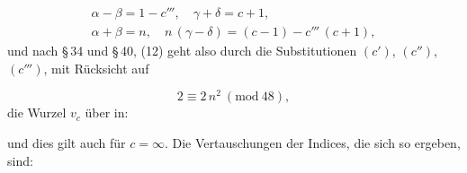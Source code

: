 
\[
\begin{gathered}
\alpha - \beta = 1 - c''', \quad \gamma + \delta = c + 1, \\
\alpha + \beta = n, \quad n\,(\gamma - \delta) = (c-1) - c'''\,(c+1),
\end{gathered}
\]
und nach \S\,34 und \S\,40, (12) geht also durch die Substitutionen $(c')$, $(c'')$, $(c''')$, mit Rücksicht auf

\[
2 \equiv 2\,n^2 \ (\mathrm{mod}\ 48),
\]
die Wurzel $v_c$ über in:


und dies gilt auch für $c = \infty$. Die Vertauschungen der Indices, die sich so ergeben, sind:

